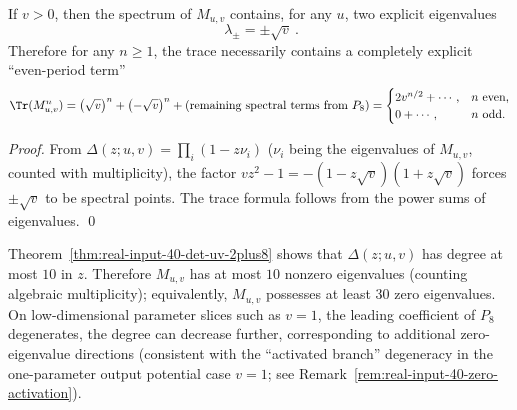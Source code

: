 \begin{corollary}\label{cor:real-input-40-zeta-uv-sqrtv-eigs}
If $v>0$, then the spectrum of $M_{u,v}$ contains, for any $u$, two explicit eigenvalues
\[
\boxed{\ \lambda_\pm=\pm\sqrt v\ }.
\]
Therefore for any $n\ge 1$, the trace necessarily contains a completely explicit ``even-period term''
\[
\Tr(M_{u,v}^{n})
=\bigl(\sqrt v\bigr)^n+\bigl(-\sqrt v\bigr)^n+\text{\rm(remaining spectral terms from $P_8$)}
=
\begin{cases}
2v^{n/2}+\cdots,& n\ \text{even},\\
0+\cdots,& n\ \text{odd}.
\end{cases}
\]
\end{corollary}
\begin{proof}
From
\(
\Delta(z;u,v)=\prod_i(1-z\nu_i)
\)
($\nu_i$ being the eigenvalues of $M_{u,v}$, counted with multiplicity), the factor $vz^2-1=-(1-z\sqrt v)(1+z\sqrt v)$ forces $\pm\sqrt v$ to be spectral points.
The trace formula follows from the power sums of eigenvalues. \qed
\end{proof}

\begin{remark}\label{rem:real-input-40-zeta-uv-effective-spectrum}
Theorem~\ref{thm:real-input-40-det-uv-2plus8} shows that $\Delta(z;u,v)$ has degree at most $10$ in $z$.
Therefore $M_{u,v}$ has at most $10$ nonzero eigenvalues (counting algebraic multiplicity); equivalently, $M_{u,v}$ possesses at least $30$ zero eigenvalues.
On low-dimensional parameter slices such as $v=1$, the leading coefficient of $P_8$ degenerates, the degree can decrease further, corresponding to additional zero-eigenvalue directions (consistent with the ``activated branch'' degeneracy in the one-parameter output potential case $v=1$; see Remark~\ref{rem:real-input-40-zero-activation}).
\end{remark}

